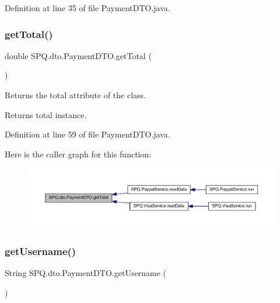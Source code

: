 Definition at line 35 of file Payment\+D\+T\+O.\+java.

\mbox{\label{class_s_p_q_1_1dto_1_1_payment_d_t_o_a04cd2104d07971407126fcf75ef17d5b}} 
\subsubsection{\texorpdfstring{get\+Total()}{getTotal()}\hspace{0.1cm}{\footnotesize\ttfamily [3/3]}}
{\footnotesize\ttfamily double S\+P\+Q.\+dto.\+Payment\+D\+T\+O.\+get\+Total (\begin{DoxyParamCaption}{ }\end{DoxyParamCaption})}

Returns the total attribute of the class. \begin{DoxyReturn}{Returns}
total instance. 
\end{DoxyReturn}


Definition at line 59 of file Payment\+D\+T\+O.\+java.

Here is the caller graph for this function\+:\nopagebreak
\begin{figure}[H]
\begin{center}
\leavevmode
\includegraphics[width=350pt]{class_s_p_q_1_1dto_1_1_payment_d_t_o_a04cd2104d07971407126fcf75ef17d5b_icgraph}
\end{center}
\end{figure}
\mbox{\label{class_s_p_q_1_1dto_1_1_payment_d_t_o_a31d0edbb3ec64b406e70cd3deaa5ab1a}} 
\subsubsection{\texorpdfstring{get\+Username()}{getUsername()}\hspace{0.1cm}{\footnotesize\ttfamily [1/3]}}
{\footnotesize\ttfamily String S\+P\+Q.\+dto.\+Payment\+D\+T\+O.\+get\+Username (\begin{DoxyParamCaption}{ }\end{DoxyParamCaption})}



